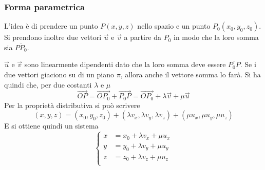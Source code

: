 \subsubsection{Forma parametrica}
L'idea è di prendere un punto $P(x,y,z)$ nello spazio e un punto $P_0(x_0,y_0,z_0)$. Si prendono 
inoltre due vettori $\vec{u}$ e $\vec{v}$ a partire da $P_0$ in modo che la loro somma sia 
$\overline{PP_0}$.
\begin{center}
\end{center}
$\vec{u}$ e $\vec{v}$ sono linearmente dipendenti dato che la loro somma deve essere 
$\overline{P_0P}$. Se i due vettori giaciono su di un piano $\pi$, allora anche il vettore somma
lo farà. Si ha quindi che, per due costanti $\lambda$ e $\mu$
\begin{equation*}
  \vec{OP}=\vec{OP_0}+\vec{P_0P} = \vec{OP_0}+\lambda\vec{v}+\mu\vec{u}
\end{equation*}
Per la proprietà distributiva si può scrivere
\begin{equation*}
  (x,y,z)=(x_0,y_0,z_0)+(\lambda v_x,\lambda v_y,\lambda v_z)+(\mu u_x,\mu u_y,\mu u_z)
\end{equation*}
E si ottiene quindi un sistema
\begin{equation*}
  \begin{cases}
    x &= x_0+\lambda v_x +\mu u_x\\
    y &= y_0+\lambda v_y +\mu u_y\\
    z &= z_0+\lambda v_z +\mu u_z\\
  \end{cases}
\end{equation*}

